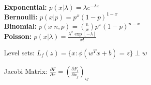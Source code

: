 

\textbf{Exponential:} $p(x|\lambda)=\lambda e^{-\lambda x}$\\
\textbf{Bernoulli:} $p(x|p)=p^x (1-p)^{1-x}$\\
\textbf{Binomial:} $p(x|n,p)={n\choose x}p^x (1-p)^{n-x}$\\
\textbf{Poisson:} $p(x|\lambda)=\frac{\lambda^x\exp[-\lambda]}{x!}$

Level sets: $L_f(z) = \{ x: \phi(w^Tx+b) = z\} \perp w$

Jacobi Matrix: $\frac{\partial F}{\partial x} = (\frac{\partial F_i}{\partial x_j})_{ij}$